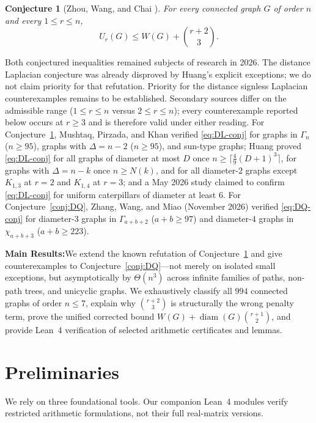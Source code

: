 \documentclass[11pt,a4paper]{article}
\newcommand{\takeaway}[2]{%
  \vspace{6pt}\noindent\colorbox{primary!8}{%
    \parbox{\dimexpr\linewidth-2\fboxsep\relax}{%
      \vspace{3pt}\textbf{\color{primary}#1:}\hspace{0.5em}#2\vspace{3pt}%
    }%
  }\vspace{6pt}%
}
\newtheorem{conjecture}[theorem]{Conjecture}
\theoremstyle{remark}
\DeclareMathOperator{\diam}{diam}
\begin{document}
\begin{conjecture}[Zhou, Wang, and Chai \cite{ZWC2025}]\label{conj:DL}
For every connected graph $G$ of order $n$ and every $1 \le r \le n$,
\begin{equation}\label{eq:DL-conj}
U_r(G) \le W(G) + \binom{r+2}{3}.
\end{equation}
\end{conjecture}

Both conjectured inequalities remained subjects of research in 2026. The distance Laplacian conjecture was already disproved by Huang's explicit exceptions; we do not claim priority for that refutation. Priority for the distance signless Laplacian counterexamples remains to be established. Secondary sources differ on the admissible range ($1\le r\le n$ versus $2\le r\le n$); every counterexample reported below occurs at $r\ge 3$ and is therefore valid under either reading. For Conjecture~\ref{conj:DL}, Mushtaq, Pirzada, and Khan \cite{MPK2026} verified \eqref{eq:DL-conj} for graphs in $\Gamma_n$ ($n \ge 95$), graphs with $\Delta = n-2$ ($n \ge 95$), and sun-type graphs; Huang \cite{Huang2026} proved \eqref{eq:DL-conj} for all graphs of diameter at most $D$ once $n \ge \lceil \frac{4}{9}(D+1)^3\rceil$, for graphs with $\Delta = n-k$ once $n \ge N(k)$, and for all diameter-$2$ graphs except $K_{1,3}$ at $r=2$ and $K_{1,4}$ at $r=3$; and a May 2026 study \cite{Caterpillar2026} claimed to confirm \eqref{eq:DL-conj} for uniform caterpillars of diameter at least $6$. For Conjecture~\ref{conj:DQ}, Zhang, Wang, and Miao \cite{ZW2026} (November 2026) verified \eqref{eq:DQ-conj} for diameter-$3$ graphs in $\Gamma_{a+b+2}$ ($a+b \ge 97$) and diameter-$4$ graphs in $\chi_{a+b+3}$ ($a+b \ge 223$).

\takeaway{Main Results}{We extend the known refutation of Conjecture~\ref{conj:DL} and give counterexamples to Conjecture~\ref{conj:DQ}---not merely on isolated small exceptions, but asymptotically by $\Theta(n^3)$ across infinite families of paths, non-path trees, and unicyclic graphs. We exhaustively classify all $994$ connected graphs of order $n \le 7$, explain why $\binom{r+2}{3}$ is structurally the wrong penalty term, prove the unified corrected bound $W(G) + \diam(G)\binom{r+1}{2}$, and provide Lean~4 verification of selected arithmetic certificates and lemmas.}

\section{Preliminaries}
We rely on three foundational tools. Our companion Lean~4 modules verify restricted arithmetic formulations, not their full real-matrix versions.
\end{document}
